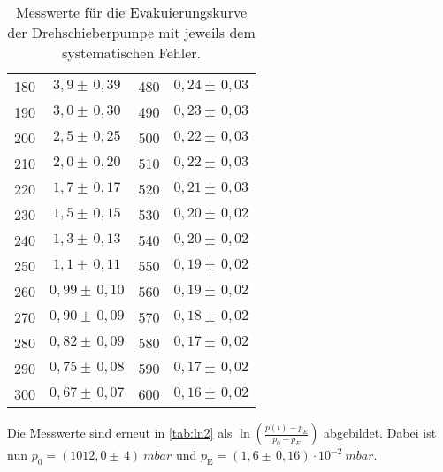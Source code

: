 \begin{table}[H]
\begin{tabular}{c|c||c|c}
  180   & $ 3,9   \pm \,  0,39 $    &  480  & $ 0,24  \pm \,  0,03 $ \\
  190   & $ 3,0   \pm \,  0,30 $     &  490  & $ 0,23  \pm \,  0,03 $ \\
  200   & $ 2,5   \pm \,  0,25 $    &  500  & $ 0,22  \pm \,  0,03 $ \\
  210   & $ 2,0   \pm \,  0,20 $     &  510  & $ 0,22  \pm \,  0,03 $ \\
  220   & $ 1,7   \pm \,  0,17 $    &  520  & $ 0,21  \pm \,  0,03 $ \\
  230   & $ 1,5   \pm \,  0,15 $    &  530  & $ 0,20  \pm \,  0,02 $ \\
  240   & $ 1,3   \pm \,  0,13 $    &  540  & $ 0,20  \pm \,  0,02 $ \\
  250   & $ 1,1   \pm \,  0,11 $    &  550  & $ 0,19  \pm \,  0,02 $ \\
  260   & $ 0,99  \pm \,  0,10 $     &  560  & $ 0,19  \pm \,  0,02 $ \\
  270   & $ 0,90   \pm \,  0,09 $    &  570  & $ 0,18  \pm \,  0,02 $ \\
  280   & $ 0,82  \pm \,  0,09 $    &  580  & $ 0,17  \pm \,  0,02 $ \\
  290   & $ 0,75  \pm \,  0,08 $    &  590  & $ 0,17  \pm \,  0,02 $ \\
  300   & $ 0,67  \pm \,  0,07 $    &  600  & $ 0,16  \pm \,  0,02 $ \\
  \end{tabular}
  \caption{Messwerte für die Evakuierungskurve der Drehschieberpumpe mit jeweils dem systematischen Fehler.}
  \label{tab:drehevak}
\end{table}

\noindent
Die Messwerte sind erneut in \autoref{tab:ln2} als $\ln\left(\frac{p(t) - p_E}{p_0 - p_E}\right)$ abgebildet. Dabei ist nun
$p_0 = (1012,0 \pm \, 4) \: \si{mbar}$ und $p_\text{E} = (1,6 \pm \, 0,16)\cdot 10^{-2} \: \si{mbar}$.

